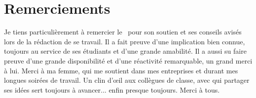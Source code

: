 \chapter*{Remerciements}

Je tiens particulièrement à remercier le \Advisor \ pour son soutien et ses conseils avisés lors de la rédaction de se travail. Il a fait preuve d'une implication bien connue, toujours au service de ses étudiants et d'une grande amabilité. Il a aussi su faire preuve d'une grande disponibilité et d'une réactivité remarquable, un grand merci à lui. Merci à ma femme, qui me soutient dans mes entreprises et durant mes longues soirées de travail. Un clin d'œil aux collègues de classe, avec qui partager ses idées sert toujours à avancer... enfin presque toujours. Merci à tous.
